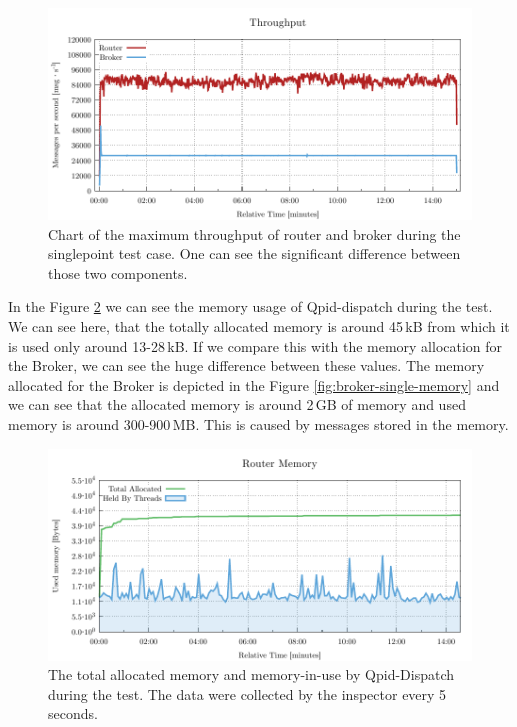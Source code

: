 \begin{figure}[H]
	\centering
	\includegraphics[width=1\linewidth]{obrazky-figures/charts/singlepoint-throughput.pdf}
	\caption{Chart of the maximum throughput of router and broker during the singlepoint test case. One can see the significant difference between those two components.}
	\label{fig:rate-single}
\end{figure}

In the Figure \ref{fig:router-single-memory} we can see the memory usage of Qpid-dispatch during the test. We can see here, that the totally allocated memory is around 45\,kB from which it is used only around 13-28\,kB. If we compare this with the memory allocation for the Broker, we can see the huge difference between these values. The memory allocated for the Broker is depicted in the Figure \ref{fig:broker-single-memory} and we can see that the allocated memory is around 2\,GB of memory and used memory is around 300-900\,MB. This is caused by messages stored in the memory.

\begin{figure}[H]
	\centering
	\includegraphics[width=1\linewidth]{obrazky-figures/charts/singlepoint-router-throughput-memory.pdf}
	\caption{The total allocated memory and memory-in-use by Qpid-Dispatch during the test. The data were collected by the inspector every 5\,seconds.}
	\label{fig:router-single-memory}
\end{figure}

